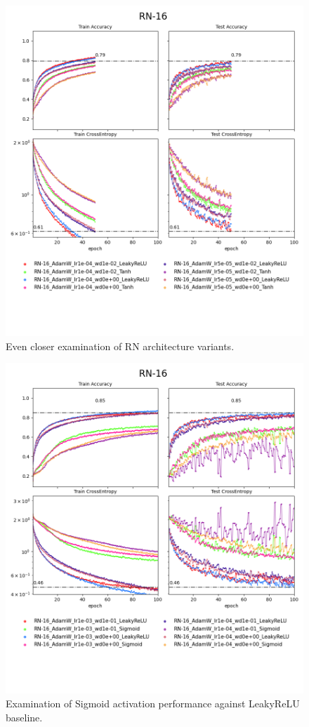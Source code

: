 \documentclass[12pt,a4paper]{article}
\begin{document}
\begin{figure}[H]
  \includegraphics[width=\textwidth, trim={0, 3.5cm, 0, 0}, clip]{../logsRN16_0.png}
  \caption{Even closer examination of RN architecture variants.}
\end{figure}

\begin{figure}[H]
  \includegraphics[width=\textwidth, trim={0, 3.5cm, 0, 0}, clip]{../logsRN16_1.png}
  \caption{Examination of Sigmoid activation performance against LeakyReLU baseline.}
\end{figure}
\end{document}
